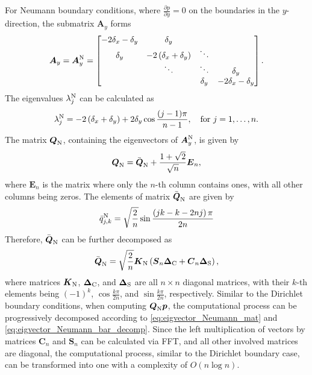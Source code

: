 \documentclass[preprint]{elsarticle}
\begin{document}
For Neumann boundary conditions, where $\frac{\partial p}{\partial y}=0$ on the boundaries in the $y$-direction, the submatrix $\boldsymbol{A}_y$ forms
\begin{equation}
    \label{eq:submat_Neumann}
    \boldsymbol{A}_y=\boldsymbol{A}_y^{\rm N}=
    \left[\begin{matrix}
        -2\delta_x-\delta_y & \delta_y \\
        \delta_y & -2\left(\delta_x+\delta_y\right) & \ddots\\
        & \ddots & \ddots & \delta_y\\
        & & \delta_y & -2\delta_x-\delta_y
    \end{matrix}\right].
\end{equation}
The eigenvalues ${\lambda}^{\rm N}_{j}$ can be calculated as
\begin{equation}
    \label{eq:eigenvalues_Neumann}
    \lambda_j^{\rm N}=-2\left(\delta_x+\delta_y\right)+2\delta_y\cos\frac{(j-1)\pi}{n-1}, \quad \text{for } j=1, \dots, n.
\end{equation}
The matrix $\boldsymbol{Q}_{\rm N}$, containing the eigenvectors of $\boldsymbol{A}_y^{\rm N}$, is given by
\begin{equation}
    \label{eq:eigvector_Neumann_mat}
    \boldsymbol{Q}_{\rm N} = \bar{\boldsymbol{Q}}_{\rm N} + \frac{1+\sqrt{2}}{\sqrt{n}}\boldsymbol{E}_n,
\end{equation}
where $\boldsymbol{E}_n$ is the matrix where only the $n$-th column contains ones, with all other columns being zeros. The elements of matrix $\bar{\boldsymbol{Q}}_{\rm N}$ are given by
\begin{equation}
    \label{eq:eigvector_Neumann_bar}
    \bar{q}^{\rm N}_{j,k}=\sqrt{\frac{2}{n}}\sin{\dfrac{\left(jk-k-2nj\right)\pi}{2n}}
\end{equation}
Therefore, $\bar{\boldsymbol{Q}}_{\rm N}$ can be further decomposed as
\begin{equation}
    \label{eq:eigvector_Neumann_bar_decomp}
    \bar{\boldsymbol{Q}}_{\rm N}=\sqrt{\frac{2}{n}}\boldsymbol{K}_{\rm N}\left(\boldsymbol{S}_{n}\boldsymbol{\Delta}_{\rm C}+\boldsymbol{C}_{n}\boldsymbol{\Delta}_{\rm S}\right),
\end{equation}
where matrices $\boldsymbol{K}_{\rm N}$, $\boldsymbol{\Delta}_{\rm C}$, and $\boldsymbol{\Delta}_{\rm S}$ are all $n \times n$ diagonal matrices, with their $k$-th elements being $\left(-1\right)^k$, $\cos\frac{k\pi}{2n}$, and $\sin\frac{k\pi}{2n}$, respectively. Similar to the Dirichlet boundary conditions, when computing $\boldsymbol{Q}_{\rm N}\boldsymbol{p}$, the computational process can be progressively decomposed according to \eqref{eq:eigvector_Neumann_mat} and \eqref{eq:eigvector_Neumann_bar_decomp}. Since the left multiplication of vectors by matrices $\boldsymbol{C}_{n}$ and $\boldsymbol{S}_{n}$ can be calculated via FFT, and all other involved matrices are diagonal, the computational process, similar to the Dirichlet boundary case, can be transformed into one with a complexity of $O\left(n\log n\right)$.
\end{document}
